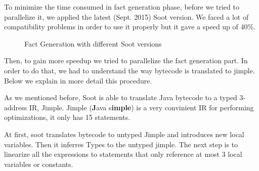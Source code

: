 \documentclass{dithesis}
\begin{document}
    	To minimize the time consumed in fact generation phase, before we tried to parallelize it, we applied the latest (Sept. 2015) Soot version. We faced a lot of compatibility problems in order to use it properly but it gave a speed up of 40\%.

		\begin{figure}[H]
			\centering
			\caption{Fact Generation with different Soot versions}
		\end{figure}

    	Then, to gain more speedup we tried to parallelize the fact generation part. In order to do that, we had to understand the way bytecode is translated to jimple. Below we explain in more detail this procedure. 

        As we mentioned before, Soot is able to translate Java bytecode to a typed 3-address IR, Jimple. Jimple (\textbf{J}ava s\textbf{imple}) is a very convinient IR for performing optimizations, it only has 15 statements.

        At first, soot translates bytecode to untyped Jimple and introduces new local variables. Then it inferres Types to the untyped jimple. The next step is to linearize all the expressions to statements that only reference at most 3 local variables or constants. 
        
\end{document}
